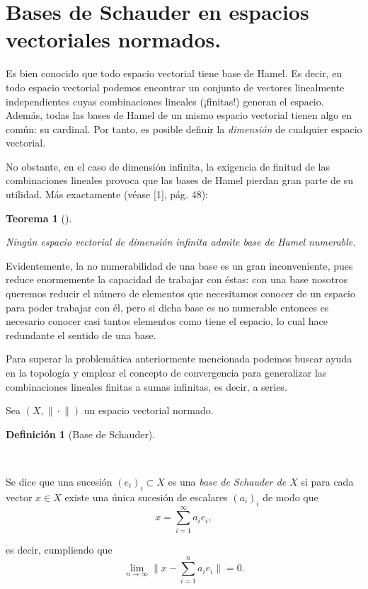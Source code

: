 \documentclass[
  spanish,
  letterpaper,
  DIV=11,
  numbers=noendperiod]{scrreprt}
\newtheorem{theorem}{Teorema}[chapter]
\theoremstyle{definition}
\newtheorem{definition}[theorem]{Definición}
\theoremstyle{remark}
\theoremstyle{definition}
\theoremstyle{exampstyle}
\theoremstyle{plain}
\theoremstyle{plain}
\theoremstyle{definition}
\newtheorem{definition}{Definición}[chapter]
\theoremstyle{plain}
\newtheorem{theorem}{Teorema}[chapter]
\theoremstyle{remark}
\begin{document}
\section{Bases de Schauder en espacios vectoriales
normados.}\label{bases-de-schauder-en-espacios-vectoriales-normados.}

Es bien conocido que todo espacio vectorial tiene base de Hamel. Es
decir, en todo espacio vectorial podemos encontrar un conjunto de
vectores linealmente independientes cuyas combinaciones lineales
(¡finitas!) generan el espacio. Además, todas las bases de Hamel de un
mismo espacio vectorial tienen algo en común: su cardinal. Por tanto, es
posible definir la \emph{dimensión} de cualquier espacio vectorial.

No obstante, en el caso de dimensión infinita, la exigencia de finitud
de las combinaciones lineales provoca que las bases de Hamel pierdan
gran parte de su utilidad. Más exactamente (véase {[}1{]}, pág. 48):

\begin{theorem}[]\protect\hypertarget{thm-first}{}\label{thm-first}

Ningún espacio vectorial de dimensión infinita admite base de Hamel
numerable.

\end{theorem}

Evidentemente, la no numerabilidad de una base es un gran inconveniente,
pues reduce enormemente la capacidad de trabajar con éstas: con una base
nosotros queremos reducir el número de elementos que necesitamos conocer
de un espacio para poder trabajar con él, pero si dicha base es no
numerable entonces es necesario conocer casi tantos elementos como tiene
el espacio, lo cual hace redundante el sentido de una base.

Para superar la problemática anteriormente mencionada podemos buscar
ayuda en la topología y emplear el concepto de convergencia para
generalizar las combinaciones lineales finitas a sumas infinitas, es
decir, a series.

Sea \((X,\|\!\cdot\!\|)\) un espacio vectorial normado.

\begin{definition}[Base de
Schauder]\protect\hypertarget{def-bs}{}\label{def-bs}

~

\hspace*{1mm}

Se dice que una sucesión \((e_i)_i\subset X\) es una \emph{base de
Schauder de \(X\)} si para cada vector \(x\in X\) existe una única
sucesión de escalares \((a_i)_i\) de modo que\\
\[
x=\sum_{i=1}^{\infty}{a_ie_i},
\]

es decir, cumpliendo que\\
\[
\lim_{n\rightarrow\infty}\big\|x-\sum_{i=1}^{n}{a_ie_i}\big\|=0.
\]

\end{definition}
\end{document}

